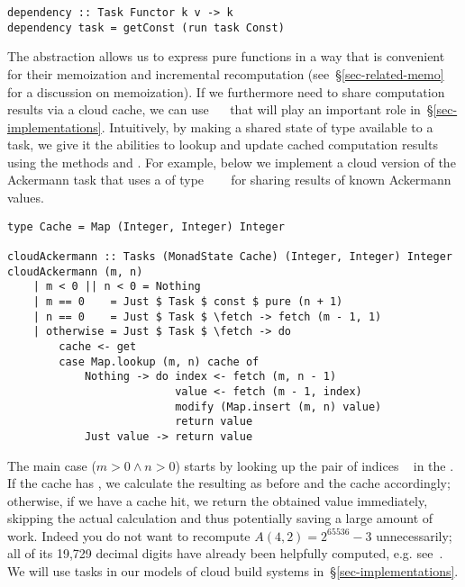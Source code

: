 \vspace{1mm}
\begin{verbatim}
dependency :: Task Functor k v -> k
dependency task = getConst (run task Const)
\end{verbatim}
\vspace{1mm}

\noindent
The  abstraction allows us to express pure functions in a way that
is convenient for their memoization and incremental recomputation
(see~\S\ref{sec-related-memo} for a discussion on memoization). If we
furthermore need to share computation results via a cloud cache, we can use
~~ that will
play an important role in~\S\ref{sec-implementations}. Intuitively, by making
a shared state of type  available to a task, we give it the abilities to
lookup and update cached computation results using the  methods
 and . For example, below we implement a cloud version of the
Ackermann task that uses a  of type
~~~ for sharing results of known
Ackermann values.

\vspace{1mm}
\begin{verbatim}
type Cache = Map (Integer, Integer) Integer

cloudAckermann :: Tasks (MonadState Cache) (Integer, Integer) Integer
cloudAckermann (m, n)
    | m < 0 || n < 0 = Nothing
    | m == 0    = Just $ Task $ const $ pure (n + 1)
    | n == 0    = Just $ Task $ \fetch -> fetch (m - 1, 1)
    | otherwise = Just $ Task $ \fetch -> do
        cache <- get
        case Map.lookup (m, n) cache of
            Nothing -> do index <- fetch (m, n - 1)
                          value <- fetch (m - 1, index)
                          modify (Map.insert (m, n) value)
                          return value
            Just value -> return value
\end{verbatim}
\vspace{1mm}

\noindent
The main case ($m>0 \wedge n>0$) starts by looking up the pair of indices
\hs{(}~ in the . If the cache has , we
calculate the resulting  as before and  the cache
accordingly; otherwise, if we have a cache hit, we return the obtained value
immediately, skipping the actual calculation and thus potentially saving a large
amount of work. Indeed you do not want to recompute $A(4,2)=2^{65536}-3$
unnecessarily; all of its 19,729 decimal digits have already been helpfully
computed, e.g. see~\cite{ackermann42}. We will use  tasks in our
models of cloud build systems in~\S\ref{sec-implementations}.
